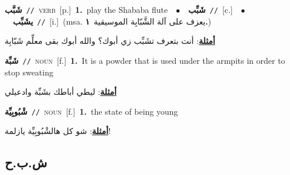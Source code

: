 \documentclass[10pt,a4paper,twoside]{article} %
\begin{document}
\begin{multicols}{2}
{\setlength\topsep{0pt}\textbf{\foreignlanguage{arabic}{شَبَّب}}\ {\color{gray}\texttt{//}\color{black}}\ \textsc{verb}\ [p.]\ \textbf{1.}~play the Shababa flute\ \ $\bullet$\ \ \setlength\topsep{0pt}\textbf{\foreignlanguage{arabic}{شَبِّب}}\ {\color{gray}\texttt{//}\color{black}}\ [c.]\ \ $\bullet$\ \ \setlength\topsep{0pt}\textbf{\foreignlanguage{arabic}{يشَبِّب}}\ {\color{gray}\texttt{//}\color{black}}\ [i.]\ \color{gray}(msa. \foreignlanguage{arabic}{يعزف على آلة الشَّبّابِة الموسيقية}~\foreignlanguage{arabic}{\textbf{١.}})\color{black}\  \begin{flushright}\color{gray}\foreignlanguage{arabic}{\textbf{\underline{\foreignlanguage{arabic}{أمثلة}}}: أنت بتعرف تشَبِّب زي أبوك؟ والله أبوك بقى معلِّم شَبّابِة}\end{flushright}\color{black}} \vspace{2mm}

{\setlength\topsep{0pt}\textbf{\foreignlanguage{arabic}{شَبِّة}}\ {\color{gray}\texttt{//}\color{black}}\ \textsc{noun}\ [f.]\ \textbf{1.}~It is a powder that is used under the armpits in order to stop sweating\  \begin{flushright}\color{gray}\foreignlanguage{arabic}{\textbf{\underline{\foreignlanguage{arabic}{أمثلة}}}: ليطي أباطك بشَبِّة وادعيلي}\end{flushright}\color{black}} \vspace{2mm}

{\setlength\topsep{0pt}\textbf{\foreignlanguage{arabic}{شْبُوبِيِّة}}\ {\color{gray}\texttt{//}\color{black}}\ \textsc{noun}\ [f.]\ \textbf{1.}~the state of being young\  \begin{flushright}\color{gray}\foreignlanguage{arabic}{\textbf{\underline{\foreignlanguage{arabic}{أمثلة}}}: شو كل هالشْبُوبِيِّة يازلمة!}\end{flushright}\color{black}} \vspace{2mm}

\vspace{-3mm}
\subsection*{\color{blue}\foreignlanguage{arabic}{ش.ب.ح}\color{blue}{}} 


\end{multicols}
\end{document}
